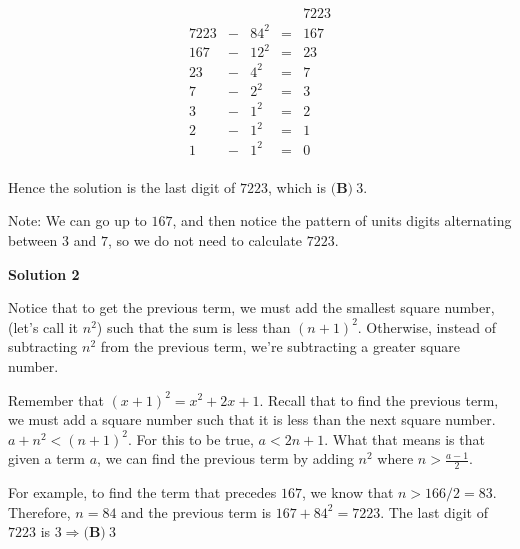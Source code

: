 \begin{enumerate}
 
 \[\begin{array}{ccccc}{}&{}&{}&{}&7223\\ 7223&-&84^{2}&=&167\\ 167&-&12^{2}&=&23\\ 23&-&4^{2}&=&7\\ 7&-&2^{2}&=&3\\ 3&-&1^{2}&=&2\\ 2&-&1^{2}&=&1\\ 1&-&1^{2}&=&0\\ \end{array}\]

 Hence the solution is the last digit of $7223$, which is $\boxed{\textbf{(B)}\ 3}$.

 Note: We can go up to $167$, and then notice the pattern of units digits alternating between $3$ and $7$, so we do not need to calculate $7223$.

 



\textbf{Solution 2}

Notice that to get the previous term, we must add the smallest square number, (let's call it $n^2$) such that the sum is less than $(n+1)^2$. Otherwise, instead of subtracting $n^2$ from the previous term, we're subtracting a greater square number. 

 
Remember that $(x+1)^2 = x^2 + 2x + 1$. Recall that to find the previous term, we must add a square number such that it is less than the next square number. $a + n^2 < (n+1)^2$. For this to be true, $a < 2n + 1$. What that means is that given a term $a$, we can find the previous term by adding $n^2$ where $n > \frac {a-1}{2}$. 

 
For example, to find the term that precedes $167$, we know that $n>166/2 = 83$. Therefore, $n=84$ and the previous term is $167 + 84^2 = 7223$. The last digit of $7223$ is $3 \Rightarrow \boxed{\textbf{(B)}\ 3}$



\end{enumerate}